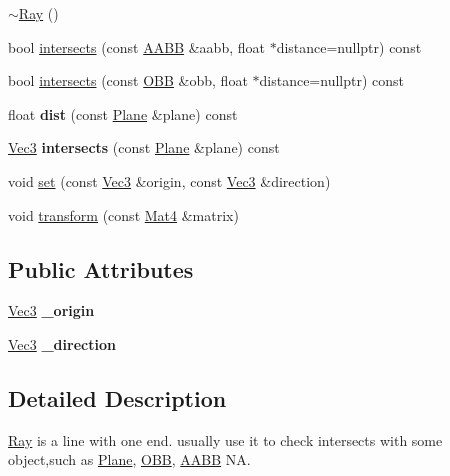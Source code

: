 \begin{DoxyCompactItemize}
\hyperlink{classRay_a8b0e575ce5df046c0c7615c32a96a46f}{$\sim$\+Ray} ()
\item 
bool \hyperlink{classRay_a2db2a0a4c6b8f67500d5b8b6542f5d50}{intersects} (const \hyperlink{classAABB}{A\+A\+BB} \&aabb, float $\ast$distance=nullptr) const
\item 
bool \hyperlink{classRay_a8cab9601415189aa8b138805c1880b12}{intersects} (const \hyperlink{classOBB}{O\+BB} \&obb, float $\ast$distance=nullptr) const
\item 
\mbox{\label{classRay_ac9e02b5199938055fc7e38c88226869c}} 
float {\bfseries dist} (const \hyperlink{classPlane}{Plane} \&plane) const
\item 
\mbox{\label{classRay_a43032ec38dddd20e36193a710979f63a}} 
\hyperlink{classVec3}{Vec3} {\bfseries intersects} (const \hyperlink{classPlane}{Plane} \&plane) const
\item 
void \hyperlink{classRay_a7a3565df0919fbffd4cbf4cf3b71b44b}{set} (const \hyperlink{classVec3}{Vec3} \&origin, const \hyperlink{classVec3}{Vec3} \&direction)
\item 
void \hyperlink{classRay_a23b3f4f7ecd94ef4ac74dba7c65fe110}{transform} (const \hyperlink{classMat4}{Mat4} \&matrix)
\end{DoxyCompactItemize}
\subsection*{Public Attributes}
\begin{DoxyCompactItemize}
\item 
\mbox{\label{classRay_af554930d75e1424a372813c880139707}} 
\hyperlink{classVec3}{Vec3} {\bfseries \+\_\+origin}
\item 
\mbox{\label{classRay_aff18d513dbe486c49f504811215cf16e}} 
\hyperlink{classVec3}{Vec3} {\bfseries \+\_\+direction}
\end{DoxyCompactItemize}


\subsection{Detailed Description}
\hyperlink{classRay}{Ray} is a line with one end. usually use it to check intersects with some object,such as \hyperlink{classPlane}{Plane}, \hyperlink{classOBB}{O\+BB}, \hyperlink{classAABB}{A\+A\+BB}  NA. 

